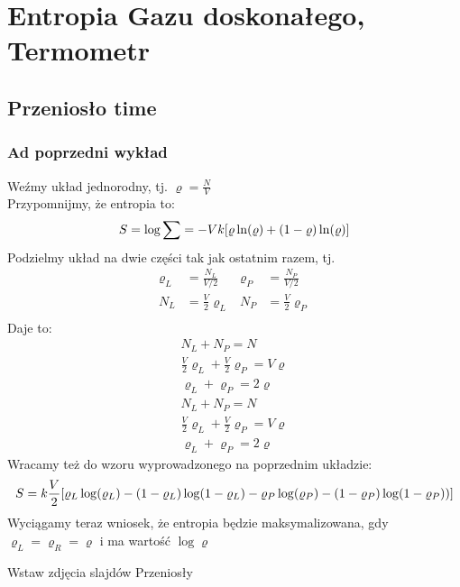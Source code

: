 \documentclass[12pt,a4paper]{report}
\newcommand{\com}[1]{{\color{red} #1}}
\newenvironment{lecture}[1]{\par\medskip
   \noindent\chapter{#1} \rmfamily}{\medskip}
\begin{document}

\begin{lecture}{Entropia Gazu doskonałego, Termometr}
    \section{Przeniosło time}
    \subsection{Ad poprzedni wykład}
    Weźmy układ jednorodny, tj. $\varrho = \frac{N}{V}$\\
    Przypomnijmy, że entropia to:
    \[
        S = \log\sum = - Vk\qty[\varrho \ln(\varrho) + (1-\varrho) \ln(\varrho)]
    \]
    Podzielmy układ na dwie części tak jak ostatnim razem, tj.
    \begin{align*}
    \varrho_L &= \frac{N_L}{V/2} & \varrho_P &= \frac{N_P}{V/2}\\
    N_L &= \frac{V}{2} \varrho_L & N_P &= \frac{V}{2} \varrho_P\\
    \end{align*}
    Daje to:
    \begin{align*}
        N_L + N_P = N\\
        \frac{V}{2} \varrho_L + \frac{V}{2} \varrho_P = V \varrho\\
        \varrho_L + \varrho_P = 2 \varrho
    \end{align*}
    \begin{align*}
    N_L + N_P = N\\
    \frac{V}{2} \varrho_L + \frac{V}{2} \varrho_P = V \varrho\\
    \varrho_L + \varrho_P = 2 \varrho
\end{align*}
Wracamy też do wzoru wyprowadzonego na poprzednim układzie:
\[
    S = k \frac{V}{2} \qty[\varrho_L \log(\varrho_L) - (1 - \varrho_L) \log(1 - \varrho_L) - \varrho_P \log(\varrho_P) - (1 - \varrho_P) \log(1 - \varrho_P))]
\]
Wyciągamy teraz wniosek, że entropia będzie maksymalizowana, gdy $\varrho_L = \varrho_R = \varrho$ i ma wartość $\log\varrho$

\com{Wstaw zdjęcia slajdów Przeniosły}


\end{lecture}
\end{document}
